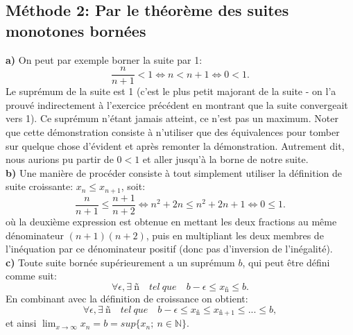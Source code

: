 \documentclass[a4paper, 12pt, french, twoside]{article}
\newcommand{\Nn}{{\mathbb{N}}}
\begin{document}
\subsection{Méthode 2: Par le théorème des suites monotones bornées}
\textbf{a)} On peut par exemple borner la suite par 1: 
\begin{equation}
    \frac{n}{n+1} < 1 \iff n < n+1 \iff 0 < 1.
\end{equation}
Le suprémum de la suite est 1 (c'est le plus petit majorant de la suite - on l'a prouvé indirectement à l'exercice précédent en montrant que la suite convergeait vers 1). Ce suprémum n'étant jamais atteint, ce n'est pas un maximum. Noter que cette démonstration consiste à n'utiliser que des équivalences pour tomber sur quelque chose d'évident et après remonter la démonstration. Autrement dit, nous aurions pu partir de $0<1$ et aller jusqu'à la borne de notre suite.\\

\textbf{b)} Une manière de procéder consiste à tout simplement utiliser la définition de suite croissante: $x_n \leq x_{n+1}$, soit:
\begin{equation}
    \frac{n}{n+1} \leq \frac{n+1}{n+2} \iff n^2 + 2n \leq n^2 + 2n + 1 \iff 0 \leq 1.
\end{equation}
où la deuxième expression est obtenue en mettant les deux fractions au même dénominateur $(n+1)(n+2)$, puis en multipliant les deux membres de l'inéquation par ce dénominateur positif (donc pas d'inversion de l'inégalité).
\\

\textbf{c)} Toute suite bornée supérieurement a un suprémum $b$, qui peut être défini comme suit:
\begin{equation}
    \forall \epsilon, \exists \ ñ \quad tel \ que \quad b-\epsilon \leq x_{ñ} \leq b.
\end{equation}
En combinant avec la définition de croissance on obtient:
\begin{equation}
    \forall \epsilon, \exists \ ñ \quad tel \ que \quad b-\epsilon \leq x_{ñ} \leq x_{ñ+1} \leq ... \leq b,
\end{equation}
et ainsi $ \lim_{x\to\infty} x_n = b = sup\{x_n; \ n \in \Nn\}$.
\\
\end{document}
